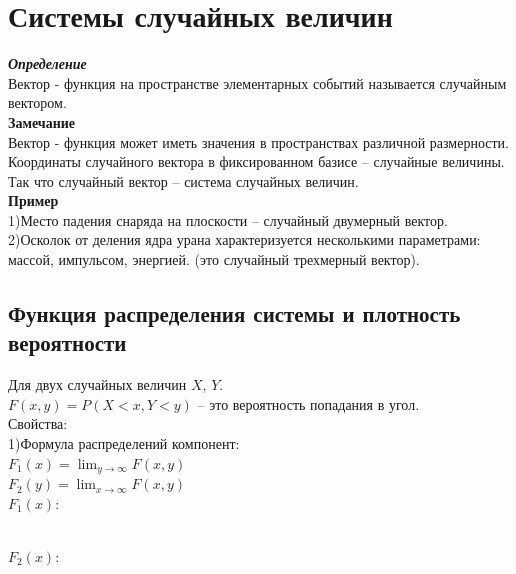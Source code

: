 \documentclass[russian, 12pt, fleqn]{article}
\begin{document}
\section{Системы случайных величин}
\noindent
\textit{\textbf{Определение}}\\
Вектор - функция на пространстве элементарных событий называется случайным вектором.\\
\textbf{Замечание\ } \\
Вектор - функция может иметь значения в пространствах различной размерности.\\
Координаты случайного вектора в фиксированном базисе -- случайные величины. Так что случайный вектор -- система случайных величин.\\
\textbf{Пример}\\
1)Место падения снаряда на плоскости -- случайный двумерный вектор.\\
2)Осколок от деления ядра урана характеризуется несколькими параметрами: массой, импульсом, энергией. (это случайный трехмерный вектор).
\subsection{Функция распределения системы и плотность вероятности}
\noindent
Для двух случайных величин $X$, $Y$.\\
$F(x, y) = P(X<x, Y<y)$ -- это вероятность попадания в угол.\\
Свойства:\\
1)Формула распределений компонент:\\
 $F_1(x) = \displaystyle{  \lim_{y\to{\infty}} F(x, y) }$ \\
 $F_2(y) = \displaystyle{  \lim_{x\to{\infty}} F(x, y) }$ \\
\newpage
$F_1(x):$\\
\\
\noindent
$F_2(x):$\\
\end{document}
